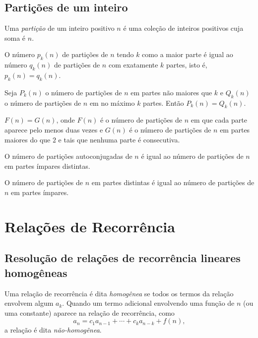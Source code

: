 \documentclass{article}
\begin{document}
\subsection{Partições de um inteiro}

\begin{defn}
    Uma \emph{partição} de um inteiro positivo \(n\) é uma coleção de inteiros positivos cuja soma é \(n\).
\end{defn}

\begin{thm} 
    O número \(p_k(n)\) de partições de \(n\) tendo \(k\) como a maior parte é igual ao número \(q_k(n)\) de partições de \(n\) com exatamente \(k\) partes, isto é, \(p_k(n) = q_k(n)\).
\end{thm}

\begin{cor}
    Seja \(P_k(n)\) o número de partições de \(n\) em partes não maiores que \(k\) e \(Q_k(n)\) o número de partições de \(n\) em no máximo \(k\) partes. Então \(P_k(n) = Q_k(n)\).
\end{cor}

\begin{thm}
    \(F(n) = G(n)\), onde \(F(n)\) é o número de partições de \(n\) em que cada parte aparece pelo menos duas vezes e \(G(n)\) é o número de partições de \(n\) em partes maiores do que \(2\) e tais que nenhuma parte é consecutiva.
\end{thm}

\begin{thm}
    O número de partições autoconjugadas de \(n\) é igual ao número de partições de \(n\) em partes ímpares distintas.
\end{thm}

\begin{thm}
    O número de partições de \(n\) em partes distintas é igual ao número de partições de \(n\) em partes ímpares.
\end{thm}

\section{Relações de Recorrência}

\subsection{Resolução de relações de recorrência lineares homogêneas}

\begin{defn}
    Uma relação de recorrência é dita \emph{homogênea} se todos os termos da relação envolvem algum \(a_k\). Quando um termo adicional envolvendo uma função de \(n\) (ou uma constante) aparece na relação de recorrência, como 
    \begin{equation}
        a_n = c_1 a_{n-1} + \cdots + c_k a_{n-k} + f(n),
    \end{equation}
    \noindent a relação é dita \emph{não-homogênea}.
\end{defn}
\end{document}
